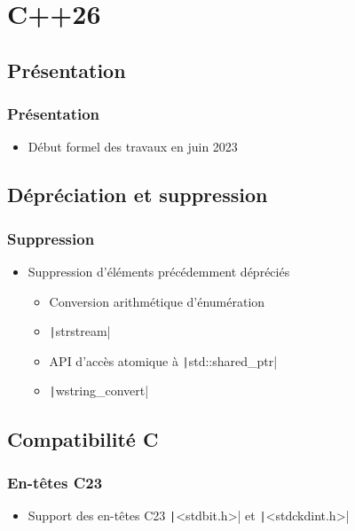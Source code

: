 \documentclass[C++.tex]{subfiles}
\begin{document}
\section{C++26}
\subsection*{Présentation}
\begin{frame}
	\frametitle{Présentation}
	\begin{itemize}
		\item Début formel des travaux en juin 2023
	\end{itemize}
\end{frame}

\subsection*{Dépréciation et suppression}
\begin{frame}[fragile]
	\frametitle{Suppression}
	\begin{itemize}
		\item Suppression d'éléments précédemment dépréciés
		\begin{itemize}
			\item Conversion arithmétique d'énumération
			\item \texttt|strstream|
			\item API d'accès atomique à \texttt|std::shared_ptr|
			\item \texttt|wstring_convert|
		\end{itemize}
	\end{itemize}

\end{frame}

\subsection*{Compatibilité C}
\begin{frame}[fragile]
	\frametitle{En-têtes C23}
	\begin{itemize}
		\item Support des en-têtes C23 \texttt|<stdbit.h>| et \texttt|<stdckdint.h>|
	\end{itemize}

\end{frame}
\end{document}
